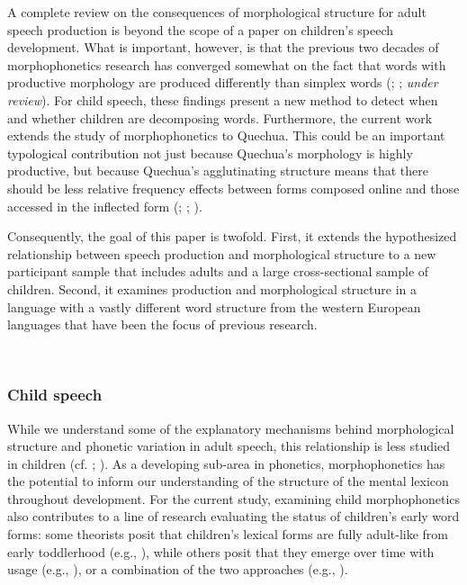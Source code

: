 \documentclass[a4paper,man,floatsintext,natbib,donotrepeattitle, apacite]{apa6}
\begin{document}
A complete  review on the consequences of morphological structure for adult speech production is beyond the scope of a paper on children's speech development. What is important, however, is that the previous two decades of morphophonetics research has converged somewhat on the fact that words with productive morphology are produced differently than simplex words (\citealt{kempsProsodicCuesMorphological2005}; \citealt{plagPhonologicalPhoneticVariability2014}; \citeauthor{tomaschekHowAnticipatoryCoarticulation2019} \textit{under review}). For child speech, these findings present a new method to detect when and whether children are decomposing words. Furthermore, the current work extends the study of morphophonetics to Quechua. This could be an important typological contribution not just because Quechua's morphology is highly productive, but because Quechua's agglutinating structure means that there should be less relative frequency effects between forms composed online and those accessed in the inflected form (\citealt{baayenQuantitativeAspectsMorphological1992}; \citealt{hayCausesConsequencesWord2003}; \citealt{pinkerFutureTense2002}). 

Consequently, the goal of this paper is twofold. First, it extends the hypothesized relationship between speech production and morphological structure to a new participant sample that includes adults and a large cross-sectional sample of children. Second, it examines production and morphological structure in a language with a vastly different word structure from the western European languages that have been the focus of previous research.   

~
~

\subsubsection{Child speech}\label{child-morph}

While we understand some of the explanatory mechanisms behind morphological structure and phonetic variation in adult speech, this relationship is less studied in children (cf. \citealt{songDurationalCuesFricative2013}; \citealt{songEffectsCoarticulationMorphological2013}). As a developing sub-area in phonetics, morphophonetics has the potential to inform our understanding of the structure of the mental lexicon throughout development. For the current study, examining child morphophonetics also contributes to a line of research evaluating the status of children's early word forms:  some theorists posit that children's lexical forms are fully adult-like from early toddlerhood (e.g., \citealt{wexlerVeryEarlyParameter1998}), while others posit that they emerge over time with usage (e.g., \citealt{ambridgeUbiquityFrequencyEffects2015}), or a combination of the two approaches (e.g., \citealt{swingleyLexicalNeighborhoodsWordForm2002}). 
\end{document}
